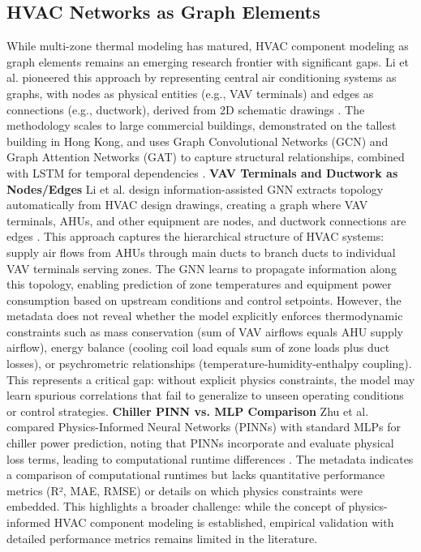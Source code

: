 \documentclass[12pt,a4paper]{article}
\begin{document}
\subsection{HVAC Networks as Graph Elements}
While multi-zone thermal modeling has matured, HVAC component modeling as graph elements remains an emerging research frontier with significant gaps. Li et al. pioneered this approach by representing central air conditioning systems as graphs, with nodes as physical entities (e.g., VAV terminals) and edges as connections (e.g., ductwork), derived from 2D schematic drawings \cite{ref33}. The methodology scales to large commercial buildings, demonstrated on the tallest building in Hong Kong, and uses Graph Convolutional Networks (GCN) and Graph Attention Networks (GAT) to capture structural relationships, combined with LSTM for temporal dependencies \cite{ref33}.
\textbf{VAV Terminals and Ductwork as Nodes/Edges}
Li et al. design information-assisted GNN extracts topology automatically from HVAC design drawings, creating a graph where VAV terminals, AHUs, and other equipment are nodes, and ductwork connections are edges \cite{ref33}. This approach captures the hierarchical structure of HVAC systems: supply air flows from AHUs through main ducts to branch ducts to individual VAV terminals serving zones. The GNN learns to propagate information along this topology, enabling prediction of zone temperatures and equipment power consumption based on upstream conditions and control setpoints.
However, the metadata does not reveal whether the model explicitly enforces thermodynamic constraints such as mass conservation (sum of VAV airflows equals AHU supply airflow), energy balance (cooling coil load equals sum of zone loads plus duct losses), or psychrometric relationships (temperature-humidity-enthalpy coupling). This represents a critical gap: without explicit physics constraints, the model may learn spurious correlations that fail to generalize to unseen operating conditions or control strategies.
\textbf{Chiller PINN vs. MLP Comparison}
Zhu et al. compared Physics-Informed Neural Networks (PINNs) with standard MLPs for chiller power prediction, noting that PINNs incorporate and evaluate physical loss terms, leading to computational runtime differences \cite{ref71}. The metadata indicates a comparison of computational runtimes but lacks quantitative performance metrics (R², MAE, RMSE) or details on which physics constraints were embedded. This highlights a broader challenge: while the concept of physics-informed HVAC component modeling is established, empirical validation with detailed performance metrics remains limited in the literature.
\end{document}
